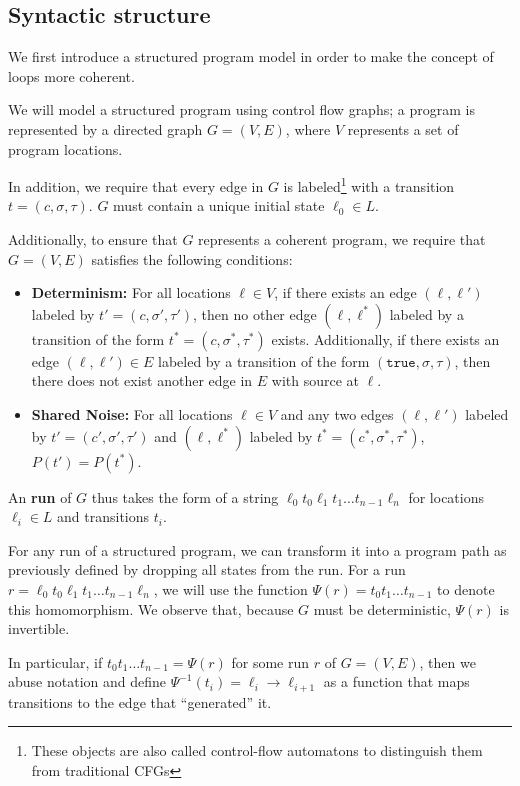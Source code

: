 
\subsection{Syntactic structure}

We first introduce a structured program model in order to make the concept of loops more coherent. 

We will model a structured program  using control flow graphs; a program is represented by a directed graph $G = (V, E)$, where $V$ represents a set of program locations. 

In addition, we require that every edge in $G$ is labeled\footnote{These objects are also called control-flow automatons to distinguish them from traditional CFGs} with a transition $t = (c, \sigma, \tau)$. $G$ must contain a unique initial state $\ell_0 \in L$.

Additionally, to ensure that $G$ represents a coherent program, we require that $G = (V, E)$ satisfies the following conditions: 
\begin{itemize}
    \item \textbf{Determinism:} For all locations $\ell\in V$, if there exists an edge $(\ell, \ell')$ labeled by $t'=(c, \sigma', \tau')$, then no other edge $(\ell, \ell^*)$ labeled by a transition of the form $t^* = (c, \sigma^*, \tau^*)$ exists. 
    Additionally, if there exists an edge $(\ell, \ell')\in E$ labeled by a transition of the form $(\texttt{true}, \sigma, \tau)$, then there does not exist another edge in $E$ with source at $\ell$.
    \item \textbf{Shared Noise:} For all locations $\ell\in V$ and any two edges $(\ell, \ell')$ labeled by $t'=(c', \sigma', \tau')$ and $(\ell, \ell^*)$ labeled by $t^* = (c^*, \sigma^*, \tau^*)$, $P(t') = P(t^*)$. 
\end{itemize}

An \textbf{run} of $G$ thus takes the form of a string $\ell_0t_0\ell_1t_1\ldots t_{n-1}\ell_n$ for locations $\ell_i\in L$ and transitions $t_i$.

For any run of a structured program, we can transform it into a program path as previously defined by dropping all states from the run. For a run $r=\ell_0t_0\ell_1t_1\ldots t_{n-1}\ell_n$, we will use the function $\Psi(r) = t_0t_1\ldots t_{n-1}$ to denote this homomorphism. We observe that, because $G$ must be deterministic, $\Psi(r)$ is invertible. 

In particular, if $t_0t_1\ldots t_{n-1} = \Psi(r)$ for some run $r$ of $G = (V, E)$, then we abuse notation and define $\Psi^{-1}(t_i) = \ell_i\to\ell_{i+1}$ as a function that maps transitions to the edge that ``generated'' it. 


